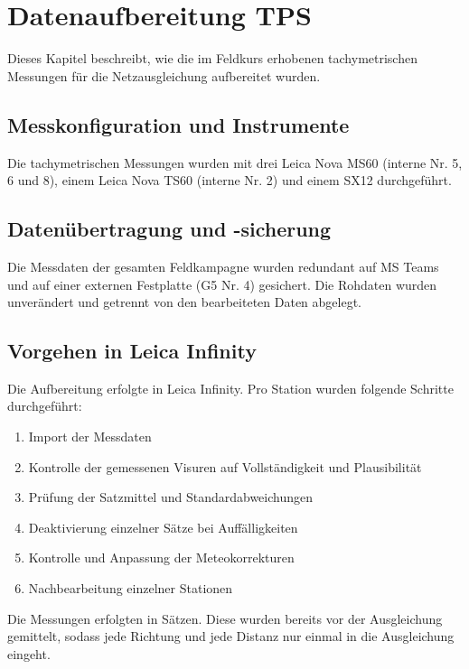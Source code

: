 \clearpage
\section{Datenaufbereitung TPS}
\label{sec:tps}
Dieses Kapitel beschreibt, wie die im Feldkurs erhobenen tachymetrischen Messungen
für die Netzausgleichung aufbereitet wurden.

\subsection{Messkonfiguration und Instrumente}
\label{sec:messkionfiguration und instrumente}
Die tachymetrischen Messungen wurden mit drei Leica Nova MS60 (interne Nr. 5, 6 und 8),
einem Leica Nova TS60 (interne Nr. 2) und einem SX12 durchgeführt.

\subsection{Datenübertragung und -sicherung}
\label{sec:datenuebertragung und -sicherung}
Die Messdaten der gesamten Feldkampagne wurden redundant auf MS Teams und auf einer
externen Festplatte (G5 Nr. 4) gesichert. Die Rohdaten wurden unverändert und getrennt
von den bearbeiteten Daten abgelegt.

\subsection{Vorgehen in Leica Infinity}
\label{sec:vorgehen in leica infinity}
Die Aufbereitung erfolgte in Leica Infinity. Pro Station wurden folgende Schritte durchgeführt:
\begin{enumerate}
    \item Import der Messdaten
    \item Kontrolle der gemessenen Visuren auf Vollständigkeit und Plausibilität
    \item Prüfung der Satzmittel und Standardabweichungen
    \item Deaktivierung einzelner Sätze bei Auffälligkeiten
    \item Kontrolle und Anpassung der Meteokorrekturen
    \item Nachbearbeitung einzelner Stationen
\end{enumerate}

Die Messungen erfolgten in Sätzen. Diese wurden bereits vor der Ausgleichung gemittelt,
sodass jede Richtung und jede Distanz nur einmal in die Ausgleichung eingeht.

